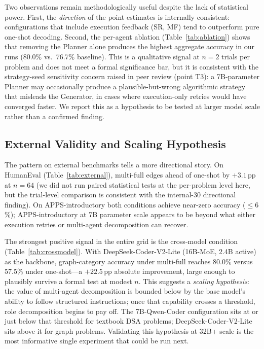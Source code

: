 \documentclass[journal]{IEEEtran}
\begin{document}
Two observations remain methodologically useful despite the lack of statistical power. First, the \emph{direction} of the point estimates is internally consistent: configurations that include execution feedback (SR, MF) tend to outperform pure one-shot decoding. Second, the per-agent ablation (Table~\ref{tab:ablation}) shows that removing the Planner alone produces the highest aggregate accuracy in our runs (80.0\% vs.\ 76.7\% baseline). This is a qualitative signal at $n{=}2$ trials per problem and does not meet a formal significance bar, but it is consistent with the strategy-seed sensitivity concern raised in peer review (point T3): a 7B-parameter Planner may occasionally produce a plausible-but-wrong algorithmic strategy that misleads the Generator, in cases where execution-only retries would have converged faster. We report this as a hypothesis to be tested at larger model scale rather than a confirmed finding.

\subsection{External Validity and Scaling Hypothesis}
The pattern on external benchmarks tells a more directional story. On HumanEval (Table~\ref{tab:external}), multi-full edges ahead of one-shot by $+3.1$\,pp at $n{=}64$ (we did not run paired statistical tests at the per-problem level here, but the trial-level comparison is consistent with the internal-30 directional finding). On APPS-introductory both conditions achieve near-zero accuracy ($\le 6$\,\%); APPS-introductory at 7B parameter scale appears to be beyond what either execution retries or multi-agent decomposition can recover.

The strongest positive signal in the entire grid is the cross-model condition (Table~\ref{tab:crossmodel}). With DeepSeek-Coder-V2-Lite (16B-MoE, 2.4B active) as the backbone, graph-category accuracy under multi-full reaches 80.0\% versus 57.5\% under one-shot---a $+22.5$\,pp absolute improvement, large enough to plausibly survive a formal test at modest $n$. This suggests a \emph{scaling hypothesis}: the value of multi-agent decomposition is bounded below by the base model's ability to follow structured instructions; once that capability crosses a threshold, role decomposition begins to pay off. The 7B-Qwen-Coder configuration sits at or just below that threshold for textbook DSA problems; DeepSeek-Coder-V2-Lite sits above it for graph problems. Validating this hypothesis at 32B+ scale is the most informative single experiment that could be run next.
\end{document}
